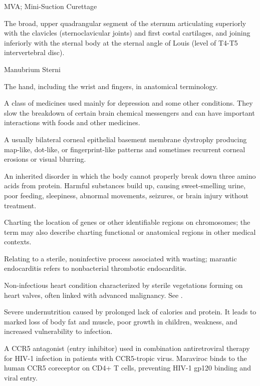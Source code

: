 \synonyms
MVA; Mini-Suction Curettage

 The broad, upper quadrangular segment of the sternum articulating superiorly with the clavicles (sternoclavicular joints) and first costal cartilages, and joining inferiorly with the sternal body at the sternal angle of Louis (level of T4-T5 intervertebral disc).

\synonyms
Manubrium Sterni

 The hand, including the wrist and fingers, in anatomical terminology.

 A class of medicines used mainly for depression and some other conditions. They slow the breakdown of certain brain chemical messengers and can have important interactions with foods and other medicines.

 A usually bilateral corneal epithelial basement membrane dystrophy producing map-like, dot-like, or fingerprint-like patterns and sometimes recurrent corneal erosions or visual blurring.

 An inherited disorder in which the body cannot properly break down three amino acids from protein. Harmful substances build up, causing sweet-smelling urine, poor feeding, sleepiness, abnormal movements, seizures, or brain injury without treatment.

 Charting the location of genes or other identifiable regions on chromosomes; the term may also describe charting functional or anatomical regions in other medical contexts.

 Relating to a sterile, noninfective process associated with wasting; marantic endocarditis refers to nonbacterial thrombotic endocarditis.

 Non-infectious heart condition characterized by sterile vegetations forming on heart valves, often linked with advanced malignancy. See .

 Severe undernutrition caused by prolonged lack of calories and protein. It leads to marked loss of body fat and muscle, poor growth in children, weakness, and increased vulnerability to infection.

 A CCR5 antagonist (entry inhibitor) used in combination antiretroviral therapy for HIV-1
infection in patients with CCR5-tropic virus. Maraviroc binds to the human CCR5
coreceptor on CD4+ T cells, preventing HIV-1 gp120 binding and viral entry.

